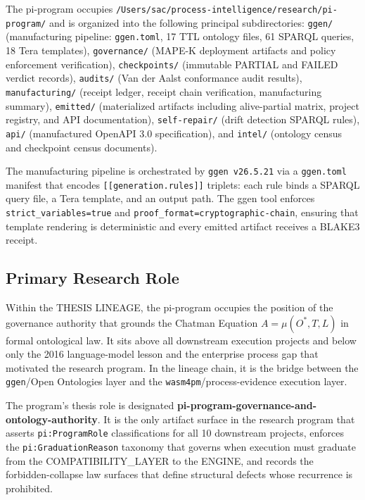 The pi-program occupies \texttt{/Users/sac/process-intelligence/research/pi-program/} and is organized into the following principal subdirectories: \texttt{ggen/} (manufacturing pipeline: \texttt{ggen.toml}, 17 TTL ontology files, 61 SPARQL queries, 18 Tera templates), \texttt{governance/} (MAPE-K deployment artifacts and policy enforcement verification), \texttt{checkpoints/} (immutable PARTIAL and FAILED verdict records), \texttt{audits/} (Van der Aalst conformance audit results), \texttt{manufacturing/} (receipt ledger, receipt chain verification, manufacturing summary), \texttt{emitted/} (materialized artifacts including alive-partial matrix, project registry, and API documentation), \texttt{self-repair/} (drift detection SPARQL rules), \texttt{api/} (manufactured OpenAPI 3.0 specification), and \texttt{intel/} (ontology census and checkpoint census documents).

The manufacturing pipeline is orchestrated by \texttt{ggen v26.5.21} via a \texttt{ggen.toml} manifest that encodes \texttt{[[generation.rules]]} triplets: each rule binds a SPARQL query file, a Tera template, and an output path. The ggen tool enforces \texttt{strict\_variables=true} and \texttt{proof\_format=cryptographic-chain}, ensuring that template rendering is deterministic and every emitted artifact receives a BLAKE3 receipt.

\subsection{Primary Research Role}
\label{sec:research-pi-program-identity-role}

Within the THESIS LINEAGE, the pi-program occupies the position of the governance authority that grounds the Chatman Equation \( A = \mu(O^{*}, T, L) \) in formal ontological law. It sits above all downstream execution projects and below only the 2016 language-model lesson and the enterprise process gap that motivated the research program. In the lineage chain, it is the bridge between the \texttt{ggen}/Open Ontologies layer and the \texttt{wasm4pm}/process-evidence execution layer.

The program's thesis role is designated \textbf{pi-program-governance-and-ontology-authority}. It is the only artifact surface in the research program that asserts \texttt{pi:ProgramRole} classifications for all 10 downstream projects, enforces the \texttt{pi:GraduationReason} taxonomy that governs when execution must graduate from the COMPATIBILITY\_LAYER to the ENGINE, and records the forbidden-collapse law surfaces that define structural defects whose recurrence is prohibited.

